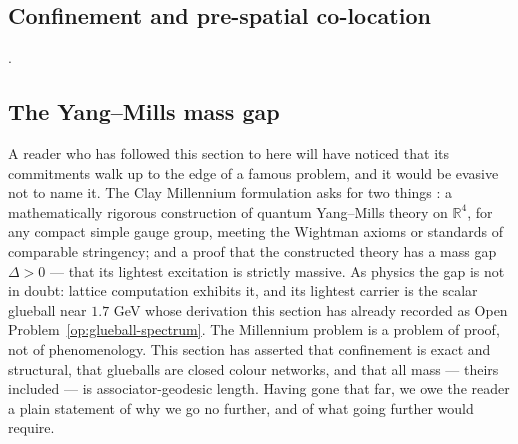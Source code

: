 \subsection{Confinement and pre-spatial co-location}.
%
%
%
%

\subsection{The Yang--Mills mass gap}
\label{sec:mass-gap}

A reader who has followed this section to here will have noticed that its commitments walk up to
the edge of a famous problem, and it would be evasive not to name it. The Clay Millennium
formulation asks for two things \autocite{jaffewitten2006}: a mathematically rigorous construction
of quantum Yang--Mills theory on $\mathbb{R}^{4}$, for any compact simple gauge group, meeting the
Wightman axioms or standards of comparable stringency; and a proof that the constructed theory has
a mass gap $\Delta > 0$ --- that its lightest excitation is strictly massive. As physics the gap is
not in doubt: lattice computation exhibits it, and its lightest carrier is the scalar glueball near
$1.7$ GeV whose derivation this section has already recorded as
Open Problem~\ref{op:glueball-spectrum}. The Millennium problem is a problem of proof, not of
phenomenology. This section has asserted that confinement is exact and structural, that glueballs
are closed colour networks, and that all mass --- theirs included --- is associator-geodesic length.
Having gone that far, we owe the reader a plain statement of why we go no further, and of what
going further would require.

